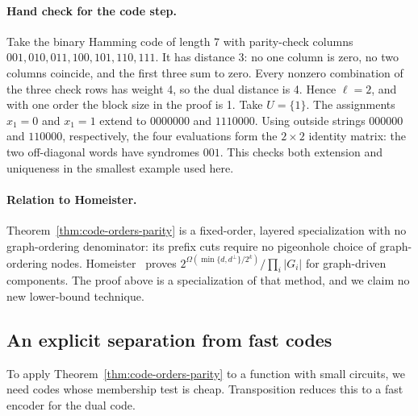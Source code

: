 \documentclass[11pt]{article}
\theoremstyle{definition}
\theoremstyle{remark}
\begin{document}
\paragraph{Hand check for the code step.}
Take the binary Hamming code of length 7 with parity-check columns
$001,010,011,100,101,110,111$.  It has distance 3: no one column is
zero, no two columns coincide, and the first three sum to zero.
Every nonzero combination of the three check rows has weight 4, so
the dual distance is 4.  Hence $\ell=2$, and with one order the block
size in the proof is 1.  Take $U=\{1\}$.
The assignments $x_1=0$ and $x_1=1$ extend to $0000000$ and
$1110000$.  Using outside strings $000000$ and $110000$, respectively,
the four evaluations form the $2\times2$ identity matrix: the two
off-diagonal words have syndromes $001$.  This checks both extension
and uniqueness in the smallest example used here.

\paragraph{Relation to Homeister.}
Theorem~\ref{thm:code-orders-parity} is a fixed-order, layered
specialization with no graph-ordering denominator: its prefix cuts
require no pigeonhole choice of graph-ordering nodes.
Homeister~\cite[Theorem~1]{Homeister03} proves
$2^{\Omega(\min\{d,d^\perp\}/2^k)}/\prod_i|G_i|$ for graph-driven
components. The proof above is a specialization of that method, and we
claim no new lower-bound technique.

\subsection{An explicit separation from fast codes}

To apply Theorem~\ref{thm:code-orders-parity} to a function with small
circuits, we need codes whose membership test is cheap. Transposition
reduces this to a fast encoder for the dual code.
\end{document}
